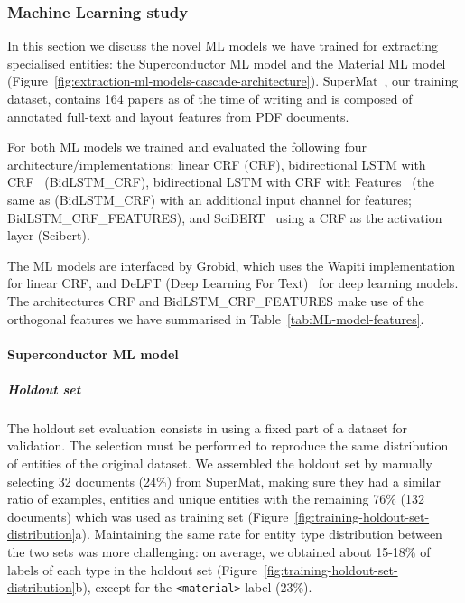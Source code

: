\subsubsection{Machine Learning study}

In this section we discuss the novel ML models we have trained for extracting specialised entities: the Superconductor ML model and the Material ML model (Figure~\ref{fig:extraction-ml-models-cascade-architecture}).
SuperMat~\cite{foppiano2021supermat}, our training dataset, contains 164 papers as of the time of writing and is composed of annotated full-text and layout features from PDF documents.

For both ML models we trained and evaluated the following four architecture/implementations: linear CRF (CRF), bidirectional LSTM with CRF~\cite{Lample2016NeuralAF} (BidLSTM\_CRF), bidirectional LSTM with CRF with Features~\cite{Lample2016NeuralAF} (the same as (BidLSTM\_CRF) with an additional input channel for features; BidLSTM\_CRF\_FEATURES), and SciBERT~\cite{Beltagy2019SciBERT} using a CRF as the activation layer (Scibert).

The ML models are interfaced by Grobid, which uses the Wapiti\cite{lavergne2010practical} implementation for linear CRF, and DeLFT (Deep Learning For Text)~\cite{DeLFT} for deep learning models.
The architectures CRF and BidLSTM\_CRF\_FEATURES make use of the orthogonal features we have summarised in Table~\ref{tab:ML-model-features}.

\paragraph*{Superconductor ML model}

\subparagraph*{Holdout set}
The holdout set evaluation consists in using a fixed part of a dataset for validation. 
The selection must be performed to reproduce the same distribution of entities of the original dataset.
We assembled the holdout set by manually selecting 32 documents (24\%) from SuperMat, making sure they had a similar ratio of examples, entities and unique entities with the remaining 76\% (132 documents) which was used as training set (Figure~\ref{fig:training-holdout-set-distribution}a).
Maintaining the same rate for entity type distribution between the two sets was more challenging: on average, we obtained about 15-18\% of labels of each type in the holdout set (Figure~\ref{fig:training-holdout-set-distribution}b), except for the \texttt{<material>} label (23\%). %


